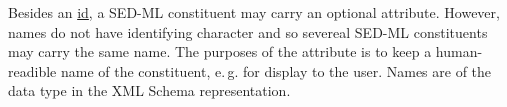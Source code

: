 \label{sec:name}
%
Besides an \hyperref[sec:id]{id}, a SED-ML constituent may carry an optional  attribute. However, names do not have identifying character and so  severeal SED-ML constituents may carry the same name. The purposes of the  attribute is to keep a human-readible name of the constituent, e.\,g. for display to the user. Names are of the data type  in the XML Schema representation.


